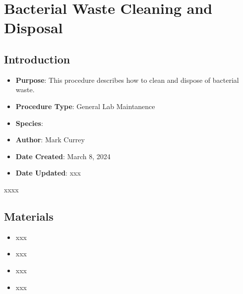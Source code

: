 \documentclass[
  letterpaper,
  DIV=11,
  numbers=noendperiod]{scrreprt}
\providecommand{\tightlist}{%
  \setlength{\itemsep}{0pt}\setlength{\parskip}{0pt}}\usepackage{longtable,booktabs,array}
\begin{document}
\hypertarget{sec-general-bact_waste}{%
\chapter{Bacterial Waste Cleaning and
Disposal}\label{sec-general-bact_waste}}

\hypertarget{introduction-4}{%
\section{Introduction}\label{introduction-4}}

\begin{itemize}
\item
  \textbf{Purpose}: This procedure describes how to clean and dispose of
  bacterial waste.
\item
  \textbf{Procedure Type}: General Lab Maintanence
\item
  \textbf{Species}:
\item
  \textbf{Author}: Mark Currey
\item
  \textbf{Date Created}: March 8, 2024
\item
  \textbf{Date Updated}: xxx
\end{itemize}

\begin{tcolorbox}[enhanced jigsaw, rightrule=.15mm, title=\textcolor{quarto-callout-warning-color}{\faExclamationTriangle}\hspace{0.5em}{NOTES}, titlerule=0mm, opacitybacktitle=0.6, toprule=.15mm, bottomrule=.15mm, opacityback=0, left=2mm, colframe=quarto-callout-warning-color-frame, breakable, coltitle=black, colback=white, colbacktitle=quarto-callout-warning-color!10!white, bottomtitle=1mm, leftrule=.75mm, toptitle=1mm, arc=.35mm]

xxxx

\end{tcolorbox}

\hypertarget{materials-4}{%
\section{Materials}\label{materials-4}}

\begin{itemize}
\tightlist
\item
  xxx
\item
  xxx
\item
  xxx
\item
  xxx
\end{itemize}
\end{document}
